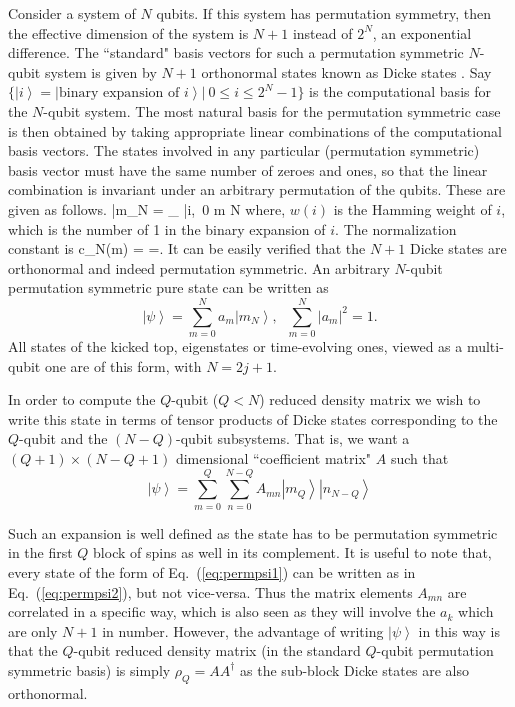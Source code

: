 \documentclass[pre,aps,showpacs,showkeys,twocolumn]{revtex4-1}
\newcommand\ket[1]{\left|#1\right\rangle}
\theoremstyle{definition}
\theoremstyle{remark}
\begin{document}
Consider a system of $N$ qubits. If this system has permutation symmetry, then the effective dimension of the system is $N + 1$ instead of $2^N$, an exponential difference. The ``standard" basis vectors for such a permutation symmetric $N$-qubit system is given by $N + 1$ orthonormal states known as Dicke states \cite{Dicke}. Say $\{\ket{i} = \ket{\text{binary expansion of } i} |\ 0 \leq i \leq 2^N - 1\}$ is the computational basis for the $N$-qubit system. The most natural basis for the permutation symmetric case is then obtained by taking appropriate linear combinations of the computational basis vectors. The states involved in any particular (permutation symmetric) basis vector must have the same number of zeroes and ones, so that the linear combination is invariant under an arbitrary permutation of the qubits.
These are given as follows.
\beq
\label{defn:stdpermsymcts} 
    \ket{m_N} =  \sum_{} \ket{i},\ 0 \leq m \leq N
\eeq
where,  $w(i)$ is the Hamming weight of $i$, which is the number of    1 in the binary expansion of $ i$. The normalization constant  is
\beq
 c_N(m) = =.
\eeq
It can be easily verified that the $N+1$ Dicke states are orthonormal and indeed permutation symmetric. An arbitrary $N$-qubit permutation symmetric pure state can be written as
\begin{equation}
    \ket{\psi} = \sum_{m=0}^{N} a_m \ket{m_N}, \;\;\sum_{m=0}^{N} |a_m|^2=1.
\label{eq:permpsi1}
\end{equation}
All states of the kicked top, eigenstates or time-evolving ones, viewed as a multi-qubit one are of this form, with $N = 2j + 1$.

In order to compute the $Q$-qubit ($Q < N$) reduced density matrix  we wish to write this state in terms of tensor products of Dicke states corresponding to the $Q$-qubit and the $(N - Q)$-qubit subsystems. That is, we want a $(Q + 1) \times (N - Q + 1)$ dimensional ``coefficient matrix" $A$ such that
\begin{equation}
    \label{eq:permpsi2}
    \ket{\psi} = \sum_{m= 0}^{Q} \sum_{n = 0}^{N - Q}A_{mn} \ket{m_Q} \ket{n_{N - Q}}
\end{equation}
 
Such an expansion is well defined as the state has to be permutation symmetric in the first $Q$ block of spins as well in its complement. It is useful to note that, every state of the form of Eq.~(\ref{eq:permpsi1}) can be written as in Eq.~(\ref{eq:permpsi2}), but not vice-versa.
Thus the matrix elements $A_{mn}$ are correlated in a specific way, which is also seen as they will involve the $a_k$ which are only $N+1$ in number. However, the advantage of writing $\ket{\psi}$ in this way is that the $Q$-qubit reduced density matrix (in the standard $Q$-qubit permutation symmetric basis) is simply $\rho_Q=A A^{\dagger}$ as the sub-block Dicke states are also orthonormal.
\end{document}
